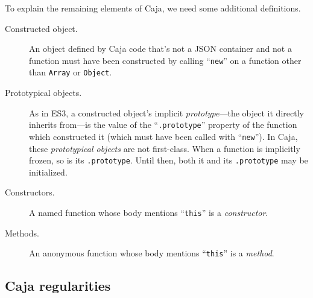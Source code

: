 \documentclass[letterpaper,twocolumn,10pt]{article}
\newcommand{\code}[1]{{\tt {#1}}}              %
\begin{document}
To explain the remaining elements of Caja, we need some additional 
definitions.

\begin{description}

  \item[Constructed object.] An object defined by Caja code that's not a JSON 
  container and not a function must have been constructed by calling 
  ``\code{new}'' on a function other than \code{Array} or \code{Object}.

  \item[Prototypical objects.] As in ES3, a constructed object's implicit \emph{prototype}---the object it directly 
  inherits from---is the value of the ``\code{.prototype}'' property of the function which constructed it (which must 
  have been called with ``\code{new}''). In Caja, these \emph{prototypical objects} are not first-class. When a 
  function is implicitly frozen, so is its \code{.prototype}. Until then, both it and its \code{.prototype} may be 
  initialized.

  \item[Constructors.] A named function whose body mentions ``\code{this}'' 
  is a \emph{constructor}. 
    
  \item[Methods.] An anonymous function whose body mentions ``\code{this}'' 
  is a \emph{method}. 
  
\end{description}


\subsection{Caja regularities}
\label{subsec:caja-reg}
\end{document}
